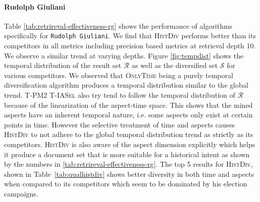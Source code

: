 \paragraph{Rudolph Giuliani} %
\label{par:paragraph_name}
Table \ref{tab:retrireval-effectiveness-rg} shows the performance of algorithms specifically for \texttt{Rudolph Giuliani}. We find that \textsc{HistDiv} performs better than its competitors in all metrics including precision based metrics at retrieval depth 10. We observe a similar trend at varying depths. Figure \ref{fig:tempdist} shows the temporal distribution of the result set $\mathcal{R}$ as well as the diversified set $\mathcal{S}$ for various competitors. We observed that \textsc{OnlyTime} being a purely temporal diversification algorithm produces a temporal distribution similar to the global trend. \textsc{T-PM2} \textsc{T-IASel} also try tend to follow the temporal distribution of $\mathcal{R}$ because of the linearization of the aspect-time space. This shows that the mined aspects have an inherent temporal nature, i.e. some aspects only exist at certain points in time. However the selective treatment of time and aspects causes \textsc{HistDiv} to not adhere to the global temporal distribution trend as strictly as its competitors. \textsc{HistDiv} is also aware of the aspect dimension explicitly which helps it produce a document set that is more suitable for a historical intent as shown by the numbers in \ref{tab:retrireval-effectiveness-rg}. The top 5 results for \textsc{HistDiv}, shown in Table~\ref{tab:qualhistdiv} shows better diversity in both time and aspects when compared to its competitors which seem to be dominated by his election campaigns.

\paragraph{}


